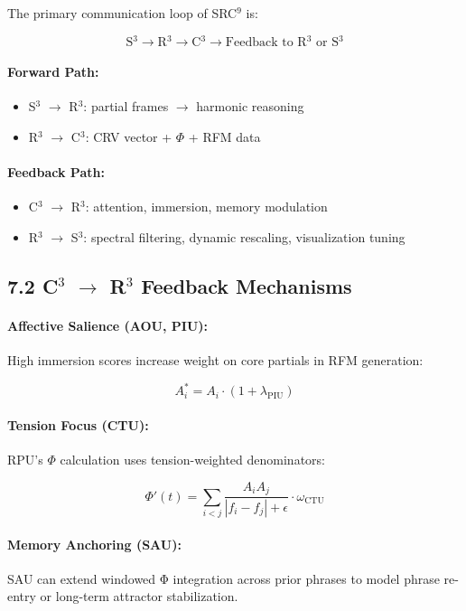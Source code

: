 The primary communication loop of SRC$^{9}$ is:

\[
\text{S$^3$} \rightarrow \text{R$^3$} \rightarrow \text{C$^3$} \rightarrow \text{Feedback to R$^3$ or S$^3$}
\]

\paragraph{Forward Path:}
\begin{itemize}
    \item S$^3$ $\rightarrow$ R$^3$: partial frames $\rightarrow$ harmonic reasoning
    \item R$^3$ $\rightarrow$ C$^3$: CRV vector + $\Phi$ + RFM data
\end{itemize}

\paragraph{Feedback Path:}
\begin{itemize}
    \item C$^3$ $\rightarrow$ R$^3$: attention, immersion, memory modulation
    \item R$^3$ $\rightarrow$ S$^3$: spectral filtering, dynamic rescaling, visualization tuning
\end{itemize}

\subsection*{7.2 C$^3$ $\rightarrow$ R$^3$ Feedback Mechanisms}

\paragraph{Affective Salience (AOU, PIU):}
High immersion scores increase weight on core partials in RFM generation:

\[
A_i^{*} = A_i \cdot (1 + \lambda_{\text{PIU}})
\]

\paragraph{Tension Focus (CTU):}
RPU’s $\Phi$ calculation uses tension-weighted denominators:

\[
\Phi'(t) = \sum_{i<j} \frac{A_i A_j}{|f_i - f_j| + \epsilon} \cdot \omega_{\text{CTU}}
\]

\paragraph{Memory Anchoring (SAU):}
SAU can extend windowed Φ integration across prior phrases to model phrase re-entry or long-term attractor stabilization.

